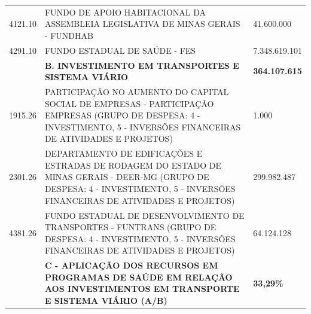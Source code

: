 \documentclass{article}
\begin{document}
\begin{longtable}[c]{m{3cm}|m{12cm}|m{3cm}}
\multicolumn{1}{C{3cm}|}{4121.10} & \multicolumn{1}{L{12cm}|}{FUNDO DE APOIO HABITACIONAL DA ASSEMBLEIA LEGISLATIVA DE MINAS GERAIS - FUNDHAB} & \multicolumn{1}{R{3cm}}{41.600.000} \\
\multicolumn{1}{C{3cm}|}{4291.10} & \multicolumn{1}{L{12cm}|}{FUNDO ESTADUAL DE SAÚDE - FES} & \multicolumn{1}{R{3cm}}{7.348.619.101} \\
\hline
\multicolumn{1}{C{3cm}|}{ \textbf{}} & \multicolumn{1}{L{12cm}|}{ \textbf{B. INVESTIMENTO EM TRANSPORTES E SISTEMA VIÁRIO}} & \multicolumn{1}{R{3cm}}{ \textbf{364.107.615}} \\
\multicolumn{1}{C{3cm}|}{1915.26} & \multicolumn{1}{L{12cm}|}{PARTICIPAÇÃO NO AUMENTO DO CAPITAL SOCIAL DE EMPRESAS - PARTICIPAÇÃO EMPRESAS (GRUPO DE DESPESA: 4 - INVESTIMENTO, 5 - INVERSÕES FINANCEIRAS DE ATIVIDADES E PROJETOS)} & \multicolumn{1}{R{3cm}}{1.000} \\
\multicolumn{1}{C{3cm}|}{2301.26} & \multicolumn{1}{L{12cm}|}{DEPARTAMENTO DE EDIFICAÇÕES E ESTRADAS DE RODAGEM DO ESTADO DE MINAS GERAIS - DEER-MG (GRUPO DE DESPESA: 4 - INVESTIMENTO, 5 - INVERSÕES FINANCEIRAS DE ATIVIDADES E PROJETOS)} & \multicolumn{1}{R{3cm}}{299.982.487} \\
\multicolumn{1}{C{3cm}|}{4381.26} & \multicolumn{1}{L{12cm}|}{FUNDO ESTADUAL DE DESENVOLVIMENTO DE TRANSPORTES - FUNTRANS (GRUPO DE DESPESA: 4 - INVESTIMENTO, 5 - INVERSÕES FINANCEIRAS DE ATIVIDADES E PROJETOS)} & \multicolumn{1}{R{3cm}}{64.124.128} \\
\hline
\multicolumn{1}{C{3cm}|}{ \textbf{}} & \multicolumn{1}{L{12cm}|}{ \textbf{C - APLICAÇÃO DOS RECURSOS EM PROGRAMAS DE SAÚDE EM RELAÇÃO AOS INVESTIMENTOS EM TRANSPORTE E SISTEMA VIÁRIO (A/B)}} & \multicolumn{1}{R{3cm}}{ \textbf{33,29\%}} \\\hline\hline\end{longtable}\raggedright\fontsize{7pt}{10pt}\selectfont {FONTE: Armazém Sisor.} \\\fontsize{7pt}{10pt}\selectfont {ELABORAÇÃO: DCAF/SCPPO/SEPLAG}\\\fontsize{7pt}{10pt}\\
\end{document}
